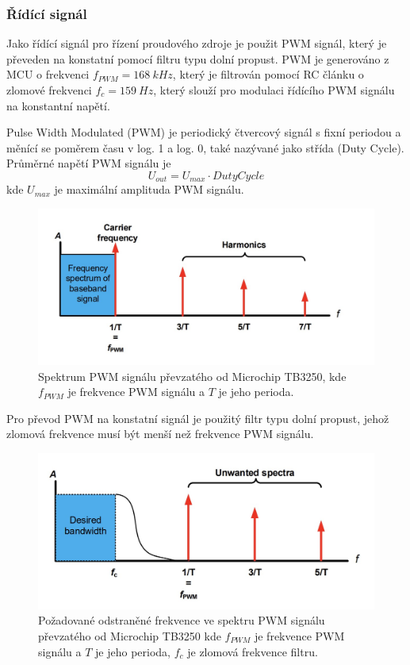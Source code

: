 \subsubsection{Řídící signál}
Jako řídící signál pro řízení proudového zdroje je použit PWM signál, který je převeden na konstatní pomocí filtru typu dolní propust. PWM je generováno z MCU o frekvenci $f_{PWM} = 168 \ kHz$, který je filtrován pomocí RC článku o zlomové frekvenci $f_c = 159 \ Hz$, který slouží pro modulaci řídícího PWM signálu na konstantní napětí.
\par
Pulse Width Modulated (PWM) je periodický čtvercový signál s fixní periodou a měnící se poměrem času v log. 1 a log. 0, také nazývané jako střída (Duty Cycle). Průměrné napětí PWM signálu je
\begin{equation}
    U_{out} = U_{max} \cdot Duty Cycle
\end{equation}
kde $U_{max}$ je maximální amplituda PWM signálu. \par
\begin{figure}[H]
    \centering
    \includegraphics[width=1\linewidth]{pictures/pwm_spectrum_microchip90003250A.jpg}
    \caption{Spektrum PWM signálu převzatého od Microchip TB3250, kde $f_{PWM}$ je frekvence PWM signálu a $T$ je jeho perioda. \cite{cite:MCPPWV}}
    \label{fig:pwm_spectrum}
\end{figure}

Pro převod PWM na konstatní signál je použitý filtr typu dolní propust, jehož zlomová frekvence musí být menší než frekvence PWM signálu.


\begin{figure}[H]
    \centering
    \includegraphics[width=1\linewidth]{pictures/rc_pwm_spectrum_microchip90003250A.jpg}
    \caption{Požadované odstraněné frekvence ve spektru PWM signálu převzatého od Microchip TB3250 kde $f_{PWM}$ je frekvence PWM signálu a $T$ je jeho perioda, $f_{c}$ je zlomová frekvence filtru.\cite{cite:MCPPWV}}
    \label{fig:unwanted_pwm_spectrum}
\end{figure}

